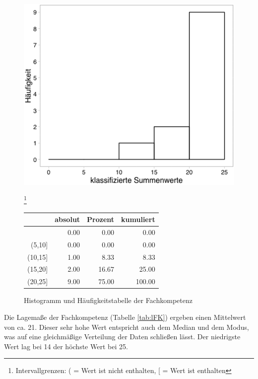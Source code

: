 \documentclass[12pt,smallheadings, bibliography=totoc]{scrartcl}
\begin{document}
\begin{figure}[H]

\begin{minipage}{.4\linewidth}
\includegraphics[width=0.8\linewidth]{Anhang/FKHistnn.png}

\end{minipage}
\begin{minipage}{.4\linewidth}
\footnote{Intervallgrenzen: ( = Wert ist nicht enthalten, [ = Wert ist enthalten}
\centering
\raisebox{\depth}
{\begin{tabular}{rrrr}
  \hline
 & absolut & Prozent & kumuliert \\
  \hline
[5] & 0.00 & 0.00 & 0.00 \\
  (5,10] & 0.00 & 0.00 & 0.00 \\
  (10,15] & 1.00 & 8.33 & 8.33 \\
  (15,20] & 2.00 & 16.67 & 25.00 \\
  (20,25] & 9.00 & 75.00 & 100.00 \\
   \hline
\end{tabular}

}
\end{minipage}
\caption{Histogramm und Häufigkeitstabelle der Fachkompetenz}
\label{FK}
\end{figure}

Die Lagemaße der Fachkompetenz (Tabelle \ref{tab:lFK}) ergeben einen
Mittelwert von ca. 21. Dieser sehr hohe Wert entspricht auch dem Median
und dem Modus, was auf eine gleichmäßige Verteilung der Daten schließen
lässt. Der niedrigste Wert lag bei 14 der höchste Wert bei 25.
\end{document}
